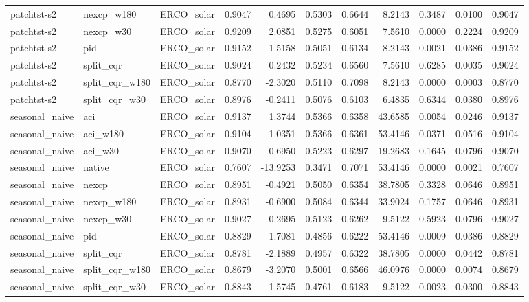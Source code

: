\begin{tabular}{lllrrrrrrrr}
patchtst-s2 & nexcp_w180 & ERCO_solar & 0.9047 & 0.4695 & 0.5303 & 0.6644 & 8.2143 & 0.3487 & 0.0100 & 0.9047 \\
patchtst-s2 & nexcp_w30 & ERCO_solar & 0.9209 & 2.0851 & 0.5275 & 0.6051 & 7.5610 & 0.0000 & 0.2224 & 0.9209 \\
patchtst-s2 & pid & ERCO_solar & 0.9152 & 1.5158 & 0.5051 & 0.6134 & 8.2143 & 0.0021 & 0.0386 & 0.9152 \\
patchtst-s2 & split_cqr & ERCO_solar & 0.9024 & 0.2432 & 0.5234 & 0.6560 & 7.5610 & 0.6285 & 0.0035 & 0.9024 \\
patchtst-s2 & split_cqr_w180 & ERCO_solar & 0.8770 & -2.3020 & 0.5110 & 0.7098 & 8.2143 & 0.0000 & 0.0003 & 0.8770 \\
patchtst-s2 & split_cqr_w30 & ERCO_solar & 0.8976 & -0.2411 & 0.5076 & 0.6103 & 6.4835 & 0.6344 & 0.0380 & 0.8976 \\
seasonal_naive & aci & ERCO_solar & 0.9137 & 1.3744 & 0.5366 & 0.6358 & 43.6585 & 0.0054 & 0.0246 & 0.9137 \\
seasonal_naive & aci_w180 & ERCO_solar & 0.9104 & 1.0351 & 0.5366 & 0.6361 & 53.4146 & 0.0371 & 0.0516 & 0.9104 \\
seasonal_naive & aci_w30 & ERCO_solar & 0.9070 & 0.6950 & 0.5223 & 0.6297 & 19.2683 & 0.1645 & 0.0796 & 0.9070 \\
seasonal_naive & native & ERCO_solar & 0.7607 & -13.9253 & 0.3471 & 0.7071 & 53.4146 & 0.0000 & 0.0021 & 0.7607 \\
seasonal_naive & nexcp & ERCO_solar & 0.8951 & -0.4921 & 0.5050 & 0.6354 & 38.7805 & 0.3328 & 0.0646 & 0.8951 \\
seasonal_naive & nexcp_w180 & ERCO_solar & 0.8931 & -0.6900 & 0.5084 & 0.6344 & 33.9024 & 0.1757 & 0.0646 & 0.8931 \\
seasonal_naive & nexcp_w30 & ERCO_solar & 0.9027 & 0.2695 & 0.5123 & 0.6262 & 9.5122 & 0.5923 & 0.0796 & 0.9027 \\
seasonal_naive & pid & ERCO_solar & 0.8829 & -1.7081 & 0.4856 & 0.6222 & 53.4146 & 0.0009 & 0.0386 & 0.8829 \\
seasonal_naive & split_cqr & ERCO_solar & 0.8781 & -2.1889 & 0.4957 & 0.6322 & 38.7805 & 0.0000 & 0.0442 & 0.8781 \\
seasonal_naive & split_cqr_w180 & ERCO_solar & 0.8679 & -3.2070 & 0.5001 & 0.6566 & 46.0976 & 0.0000 & 0.0074 & 0.8679 \\
seasonal_naive & split_cqr_w30 & ERCO_solar & 0.8843 & -1.5745 & 0.4761 & 0.6183 & 9.5122 & 0.0023 & 0.0300 & 0.8843 \\

\end{tabular}
